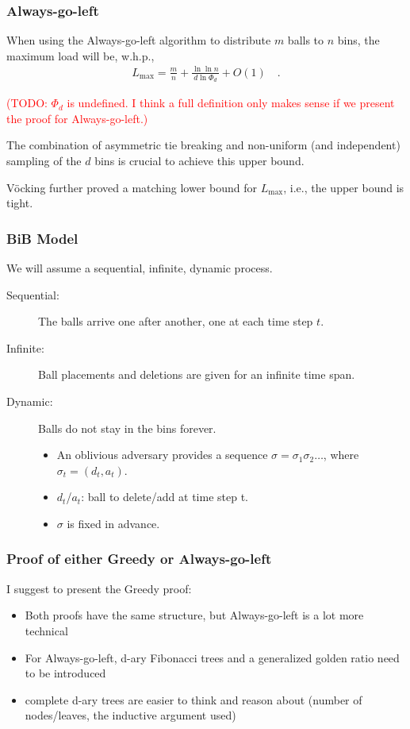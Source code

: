 \documentclass[serif,professionalfonts]{beamer}
\newcommand\todo[1]{\textcolor{red}{(TODO: #1)}}
\newcommand\load{L_{\mathrm{max}}}
\begin{document}
\begin{frame}
\frametitle{Always-go-left}
\begin{theorem}[V\"ocking, 2003]
When using the \alert{Always-go-left} algorithm to distribute $m$ balls to $n$ bins, the maximum load will be, w.h.p.,
\begin{align*}
\load = \frac{m}{n} + \frac{\ln \ln n}{d \ln \Phi_d} + O(1) \quad .
\end{align*}
\end{theorem}
\todo{$\Phi_d$ is undefined. I think a full definition only makes sense if we present the proof for Always-go-left.}

\pause
\bigskip
The combination of \alert{asymmetric tie breaking} and \alert{non-uniform} (and independent) sampling of the $d$ bins is crucial to achieve this upper bound.

\medskip
V\"ocking further proved a matching lower bound for $\load$, i.e., the upper bound is tight.

\end{frame}

\begin{frame}
\frametitle{BiB Model}
We will assume a sequential, infinite, dynamic process.

\begin{description}
\item[\alert{Sequential:}] The balls arrive one after another, one at each time step $t$.
\item[\alert{Infinite:}] Ball placements and deletions are given for an infinite time span.
\item[\alert{Dynamic:}] Balls do not stay in the bins forever.
\begin{itemize}
\item An oblivious adversary provides a sequence $\sigma = \sigma_1 \sigma_2 \dots$, where $\sigma_t = (d_t, a_t)$.
\item $d_t$/$a_t$: ball to delete/add at time step t. \\
\item $\sigma$ is fixed in advance.
\end{itemize}
\end{description}
\end{frame}

\begin{frame}
\frametitle{Proof of either Greedy or Always-go-left}
I suggest to present the Greedy proof:
\begin{itemize}
\item Both proofs have the same structure, but Always-go-left is a lot more technical
\item For Always-go-left, d-ary Fibonacci trees and a generalized golden ratio need to be introduced
\item complete d-ary trees are easier to think and reason about (number of nodes/leaves, the inductive argument used)
\end{itemize}
\end{frame}
\end{document}
